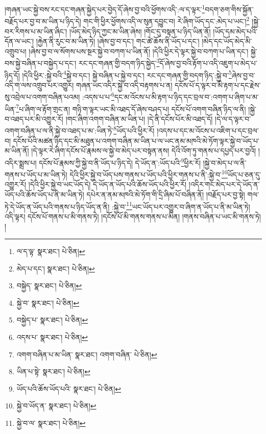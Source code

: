 །གཞན་ཡང་སྐྱེ་བས་རང་དང་གཞན་སྐྱེད་པར་བྱེད་དོ་ཞེས་བྱ་བའི་ཕྱོགས་འདི་:ལ་ད་ལྟར་\footnote{ལ་ད་ལྟ་  སྣར་ཐང་།  པེ་ཅིན། }བདག་ཅག་གིས་སྐྱོན་བརྗོད་པར་བྱ་བ་མ་ཡིན་པ་ཉིད་དེ། གང་གི་ཕྱིར་ཕྱོགས་འདི་ལ་སུན་དབྱུང་བ། རེ་ཞིག་ཡོད་དང་:མེད་པ་ཡང་།\footnote{མེད་པ་དང་།  སྣར་ཐང་།  པེ་ཅིན། } །སྐྱེ་བར་རིགས་པ་མ་ཡིན་ཞིང་། །ཡོད་མེད་ཉིད་ཀྱང་མ་ཡིན་ཞེས། །གོང་དུ་བསྟན་པ་ཉིད་ཡིན་ནོ། །ཡོད་དམ་མེད་པའི་དོན་ལ་ཡང་། །རྐྱེན་ནི་རུང་བ་མ་ཡིན་ཏེ། །ཞེས་བྱ་བ་དང་། གང་ཚེ་ཆོས་ནི་ཡོད་པ་དང་། །མེད་དང་ཡོད་མེད་མི་འགྲུབ་པ། །ཞེས་བྱ་བ་ལ་སོགས་པས་སྔར་སྐྱེ་བ་བཀག་པ་ཡིན་ནོ། །དེའི་ཕྱིར་དེ་ལྟར་སྐྱེ་བ་བཀག་པ་ཡིན་དང་། སྐྱེ་བས་སྐྱེ་བཞིན་པ་བསྐྱེད་པ་དང་། རང་དང་གཞན་གྱི་བདག་ཉིད་སྐྱེད་\footnote{བསྐྱེད་  སྣར་ཐང་།  པེ་ཅིན། }དོ་ཞེས་བྱ་བའི་རྟོག་པ་འདི་འཇུག་པ་མེད་པ་ཉིད་དོ། །དེའི་ཕྱིར་:སྐྱེ་བའི་\footnote{སྐྱེ་བ་  སྣར་ཐང་།  པེ་ཅིན། }སྐྱེ་བ་དང་། སྐྱེ་བཞིན་པ་སྐྱེ་བ་དང་། རང་དང་གཞན་གྱི་བདག་ཉིད་:སྐྱེ་བ་\footnote{བསྐྱེད་པ་  སྣར་ཐང་།  པེ་ཅིན། }ཞེས་བྱ་བ་འདི་ག་ལས་འགྲུབ་པར་འགྱུར། གཞན་ཡང་འདིར་སྐྱེ་བ་འདི་བརྟགས་པ་ན། དངོས་པོ་ད་ལྟར་བ་མི་རྟག་པ་དང་རྗེས་སུ་འབྲེལ་པ་འགག་བཞིན་པའམ། :འདས་པ་པ་\footnote{འདས་པ་  སྣར་ཐང་།  པེ་ཅིན། }དང་མ་འོངས་པ་མི་རྟག་པ་ཉིད་དང་བྲལ་བ་:འགག་པ་ཞིག་པ་མ་ཡིན་\footnote{འགག་བཞིན་པ་མ་ཡིན་  སྣར་ཐང་། འགག་བཞིན་  པེ་ཅིན། }པ་ཞིག་ལ་རྟོག་གྲང་ན། གཉི་ག་ལྟར་ཡང་མི་འཐད་དོ་ཞེས་བཤད་པ། དངོས་པོ་འགག་བཞིན་ཉིད་ལ་ནི། །སྐྱེ་བ་འཐད་པར་མི་འགྱུར་རོ། །གང་ཞིག་འགག་བཞིན་མ་ཡིན་པ། །དེ་ནི་དངོས་པོར་མི་འཐད་དོ། །དེ་ལ་ད་ལྟར་བ་འགག་བཞིན་པ་ལ་ནི་སྐྱེ་བ་འཐད་པ་མ་:ཡིན་ཏེ་\footnote{ཡིན་པ་སྟེ་  སྣར་ཐང་།  པེ་ཅིན། }ཡོད་པའི་ཕྱིར་རོ། །འདས་པ་དང་མ་འོངས་པ་འཇིག་པ་དང་བྲལ་བ། དངོས་པོའི་མཚན་ཉིད་དང་མི་མཐུན་པ་འགག་བཞིན་མ་ཡིན་པ་ལ་ཡང་ནམ་མཁའི་མེ་ཏོག་ལྟར་སྐྱེ་བ་ཡོད་པ་མ་ཡིན་ནོ། །དེ་ལྟར་རེ་ཞིག་དངོས་པོ་རྣམས་ལ་སྐྱེ་བ་མེད་པར་བསྟན་ནས། དེའི་འོག་ཏུ་གནས་པ་དཔྱད་པར་བྱའོ། །འདིར་སྨྲས་པ། དངོས་པོ་རྣམས་ཀྱི་སྐྱེ་བ་ནི་ཡོད་པ་ཉིད་དེ། དེ་ཡོད་ན་:ཡོད་པའི་\footnote{ཡོད་པའི་ཆོས་ཡོད་པའི་  སྣར་ཐང་།  པེ་ཅིན། }ཕྱིར་རོ། །སྐྱེ་བ་མེད་པ་ལ་ནི་གནས་པ་ཡོད་པ་མ་ཡིན་ཏེ། དེའི་ཕྱིར་སྐྱེ་བ་ཡོད་པས་གནས་པ་ཡོད་པའི་ཕྱིར་གནས་པ་ནི་:སྐྱེ་བ་\footnote{སྐྱེ་བ་ཡོད་ན་  སྣར་ཐང་།  པེ་ཅིན། }ཡོད་པ་ཅན་དུ་འགྱུར་རོ། །དེའི་ཕྱིར་སྐྱེ་བ་ཡང་ཡོད་དེ། དེ་ཡོད་ན་ཡོད་པའི་ཆོས་ཡོད་པའི་ཕྱིར་རོ། །འདིར་གང་མེད་པར་དེ་ཡོད་ན་ཡོད་པའི་ཆོས་ཡོད་པ་ནི་མ་ཡིན་ཏེ། དཔེར་ན་ནམ་མཁའི་མེ་ཏོག་གི་དྲི་ཞིམ་པོ་བཞིན་ནོ། །བརྗོད་པར་བྱ་སྟེ། གལ་ཏེ་དེ་ཡོད་ན་ཡོད་པའི་གནས་པ་ཉིད་ཡོད་ན་ནི། :སྐྱེ་བ་\footnote{སྐྱེ་བ་ལ་  སྣར་ཐང་།  པེ་ཅིན། }ཡང་ཡོད་པར་འགྱུར་བ་ཞིག་ན་ཡོད་པ་ནི་མ་ཡིན་ཏེ། འདི་ལྟར། དངོས་པོ་གནས་པ་མི་གནས་ཏེ། །དངོས་པོ་མི་གནས་གནས་པ་མིན། །གནས་བཞིན་པ་ཡང་མི་གནས་ཏེ། །
